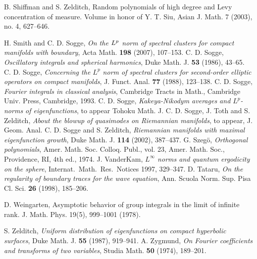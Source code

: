 \documentclass[10pt]{amsart}
\begin{document}
\begin{thebibliography}{99}
  B. Shiffman and S. Zelditch,  Random polynomials of high degree and Levy concentration of
   measure. Volume in honor of Y. T. Siu,  Asian J. Math. 7 (2003), no. 4, 627--646.

 H. Smith and C. D. Sogge, {\em On the $L\sp p$ norm of spectral clusters for compact manifolds with boundary}, Acta Math. {\bf 198} (2007), 107--153.
 C. D. Sogge, {\em Oscillatory integrals and spherical harmonics},  Duke Math. J.
{\bf 53}  (1986),  43--65.
 C. D. Sogge, {\em Concerning the $L^p$ norm of spectral clusters for second-order elliptic operators on compact manifolds}, J. Funct. Anal. {\bf 77} (1988), 123--138.
 C. D. Sogge, {\em Fourier integrals in classical analysis}, Cambridge Tracts in Math., Cambridge Univ. Press, Cambridge, 1993.
 C. D. Sogge, {\em Kakeya-Nikodym averages and $L^p$-norms
of eigenfunctions}, to appear Tohoku Math. J.
 C. D. Sogge, J. Toth and S. Zelditch, {\em About the blowup of quasimodes
on Riemannian manifolds}, to appear, J. Geom. Anal.
 C. D. Sogge and S. Zelditch, {\em Riemannian manifolds with maximal
eigenfunction growth}, Duke Math. J. {\bf 114} (2002), 387--437.
 G. Szeg\"o, {\em Orthogonal polynomials}, Amer. Math. Soc. Colloq. Publ.,
vol. 23, Amer. Math. Soc., Providence, RI, 4th ed., 1974.
 J. VanderKam, {\em
 $L^\infty$ norms and quantum ergodicity on the sphere}, Internat.\ Math.\
  Res.\ Notices 1997,  329--347.
 D. Tataru, {\em On the regularity of boundary traces for the wave equation},
Ann. Scuola Norm. Sup. Pisa Cl. Sci.   {\bf 26}  (1998),   185--206.

 D.
Weingarten, Asymptotic behavior of group integrals in the limit of
infinite rank. J. Math. Phys. 19(5), 999--1001 (1978).

 S. Zelditch, {\em Uniform distribution of eigenfunctions on compact hyperbolic surfaces},  Duke Math. J.  {\bf 55}  (1987),  919--941.
\bibitem{zygmund} A. Zygmund, {\em On Fourier coefficients and transforms of
two variables}, Studia Math. {\bf 50} (1974), 189--201.

\end{thebibliography}
\end{document}
